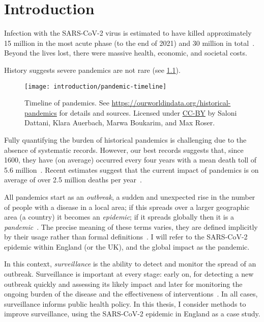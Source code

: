 \documentclass[thesis.tex]{subfiles}
\begin{document}
\chapter{Introduction} \label{intro}

Infection with the SARS-CoV-2 virus is estimated to have killed approximately 15 million in the most acute phase (to the end of 2021) and 30 million in total~\autocite{whoCOVIDExcess,economistCOVIDExcess}.
Beyond the lives lost, there were massive health, economic, and societal costs.

History suggests severe pandemics are not rare (see \cref{intro:fig:pandemic-timeline}).
\begin{figure}
    \texttt{[image: introduction/pandemic-timeline]}
    \caption[Timeline of pandemics.]{%
        Timeline of pandemics.
        See \url{https://ourworldindata.org/historical-pandemics} for details and sources.
        Licensed under \href{https://creativecommons.org/licenses/by/4.0/}{CC-BY} by Saloni Dattani, Klara Auerbach, Marwa Boukarim, and Max Roser.
    }
    \label{intro:fig:pandemic-timeline}
\end{figure}
Fully quantifying the burden of historical pandemics is challenging due to the absence of systematic records.
However, our best records suggests that, since 1600, they have (on average) occurred every four years with a mean death toll of 5.6 million~\autocite{maraniNovelEpidemics}.
Recent estimates suggest that the current impact of pandemics is on average of over 2.5 million deaths per year~\autocite{madhavPandemicMortality}.

All pandemics start as an \emph{outbreak}, a sudden and unexpected rise in the number of people with a disease in a local area; if this spreads over a larger geographic area (\eg a country) it becomes an \emph{epidemic}; if it spreads globally then it is a \emph{pandemic}~\autocite{grennanPandemic}.
The precise meaning of these terms varies, they are defined implicitly by their usage rather than formal definitions~\autocite{morensPandemic,doshiElusive}.
I will refer to the SARS-CoV-2 epidemic within England (or the UK), and the global impact as the pandemic.

In this context, \emph{surveillance} is the ability to detect and monitor the spread of an outbreak.
Surveillance is important at every stage: early on, for detecting a new outbreak quickly and assessing its likely impact and later for monitoring the ongoing burden of the disease and the effectiveness of interventions~\autocite{whoFluSurveillance}.
In all cases, surveillance informs public health policy.
In this thesis, I consider methods to improve surveillance, using the SARS-CoV-2 epidemic in England as a case study.
\end{document}
